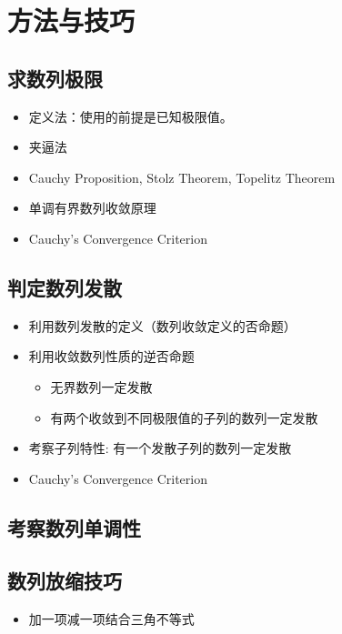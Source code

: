 \documentclass[onecolumn]{ctexart}
\begin{document}
\section{方法与技巧}

\subsection{求数列极限}
\begin{itemize}
  \item 定义法：使用的前提是已知极限值。
  \item 夹逼法
  \item Cauchy Proposition, Stolz Theorem, Topelitz Theorem
  \item 单调有界数列收敛原理
  \item Cauchy's Convergence Criterion
\end{itemize}

\subsection{判定数列发散}
\begin{itemize}
  \item 利用数列发散的定义（数列收敛定义的否命题）
  \item 利用收敛数列性质的逆否命题
  \begin{itemize}
    \item 无界数列一定发散
    \item 有两个收敛到不同极限值的子列的数列一定发散
  \end{itemize}
  \item 考察子列特性: 有一个发散子列的数列一定发散
  \item Cauchy's Convergence Criterion
\end{itemize}

\subsection{考察数列单调性}

\subsection{数列放缩技巧}
\begin{itemize}
  \item 加一项减一项结合三角不等式
\end{itemize}
\end{document}
